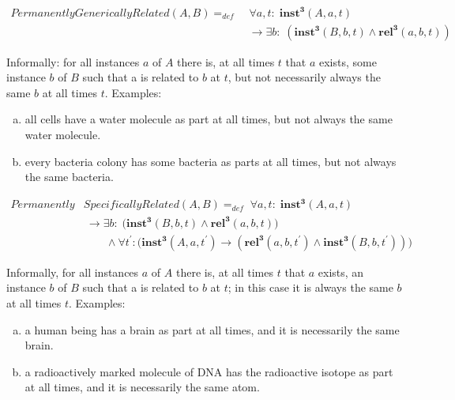 \documentclass{ao2e}
\newcommand{\mirel}[1]{\ensuremath{\mathrm{\mathbf{#1}}}}
\newcommand{\mclass}[1]{\ensuremath{\mathit{#1}}}
\newcommand{\mrel}[2]{\mirel{#1^#2}}
\newcommand{\mrelt}[1]{\mrel{#1}{3}}
\begin{document}
\begin{equation}
\begin{split}
\mclass{PermanentlyGenericallyRelated}(\mclass{A},\mclass{B}) =_{def}&\;
\forall a, t:\; \mrelt{inst}(\mclass{A}, a, t) \\
&\ \rightarrow
\exists b:\;(\mrelt{inst}(\mclass{B},b,t) \wedge
\mrelt{rel}(a,b,t))
\end{split}
\label{eq:generically}
\end{equation}

Informally: for all instances $a$ of \mclass{A} there is, at all times $t$ that
$a$ exists,
some instance $b$ of \mclass{B} such that a is related to $b$ at $t$, but not necessarily
always the same $b$ at all times $t$. Examples:
\begin{enumerate}[(a)]
\item all cells have a water molecule as
part at all times, but not always the same water molecule.
\item every bacteria colony has some bacteria as parts at all times, but not
always the same bacteria.
\end{enumerate}


\begin{equation}
\begin{split}
\mclass{Permanently}&\mclass{SpecificallyRelated}(\mclass{A},\mclass{B}) =_{def}\;
\forall a, t:\; \mrelt{inst}(\mclass{A}, a, t) \\
&\ \rightarrow 
\exists b:\;\big(\mrelt{inst}(\mclass{B},b,t) \wedge 
\mrelt{rel}(a,b,t))
\\
&\quad\quad \wedge \forall t^\prime: (\mrelt{inst}(\mclass{A},a,t^\prime)
\rightarrow (\mrelt{rel}(a,b,t^\prime) \wedge
\mrelt{inst}(\mclass{B},b,t^\prime))\big)
\end{split}
\label{eq:specifically}
\end{equation}

Informally, for all instances $a$ of \mclass{A} there is, at all times $t$ that $a$ exists, an
instance $b$ of \mclass{B} such that a is related to $b$ at $t$; in this case it is always the
same $b$ at all times $t$. Examples:
\begin{enumerate}[(a)]
\item a human being has a brain as part at all times, and it is necessarily the same brain.
\item a radioactively marked molecule of DNA has the radioactive isotope as part
at all times, and it is necessarily the same atom.
\end{enumerate} 
\end{document}
